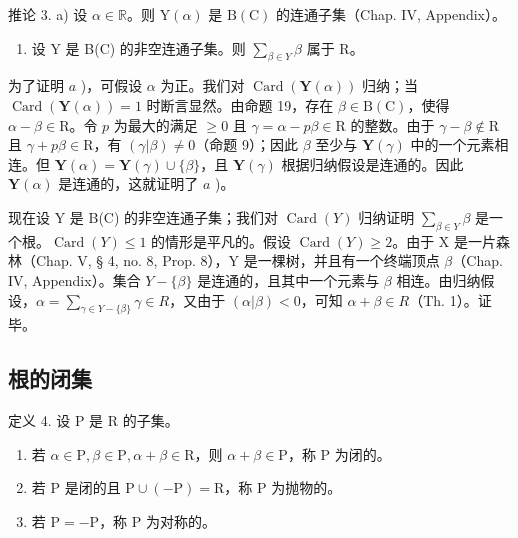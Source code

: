 推论 3. a) 设 \(\alpha \in \mathbb{R}\)。则 \(\mathrm{Y}(\alpha)\) 是 \(\mathrm{B}(\mathrm{C})\) 的连通子集（Chap. IV, Appendix）。

\begin{enumerate}
\def\labelenumi{\alph{enumi})}
\setcounter{enumi}{1}
\tightlist
\item
  设 Y 是 B(C) 的非空连通子集。则 \(\sum_{\beta\in Y}\beta\) 属于 R。
\end{enumerate}

为了证明 \(a\) )，可假设 \(\alpha\) 为正。我们对 \(\operatorname{Card}(\mathbf{Y}(\alpha))\) 归纳；当 \(\operatorname{Card}(\mathbf{Y}(\alpha)) = 1\) 时断言显然。由命题 19，存在 \(\beta \in \mathrm{B}(\mathrm{C})\)，使得 \(\alpha - \beta \in \mathrm{R}\)。令 \(p\) 为最大的满足 \(\geqslant 0\) 且 \(\gamma = \alpha - p\beta \in \mathrm{R}\) 的整数。由于 \(\gamma - \beta \notin \mathrm{R}\) 且 \(\gamma + p\beta \in \mathrm{R}\)，有 \((\gamma|\beta) \neq 0\)（命题 9）；因此 \(\beta\) 至少与 \(\mathbf{Y}(\gamma)\) 中的一个元素相连。但 \(\mathbf{Y}(\alpha) = \mathbf{Y}(\gamma) \cup \{\beta\}\)，且 \(\mathbf{Y}(\gamma)\) 根据归纳假设是连通的。因此 \(\mathbf{Y}(\alpha)\) 是连通的，这就证明了 \(a\) )。

现在设 Y 是 B(C) 的非空连通子集；我们对 \(\operatorname{Card}(Y)\) 归纳证明 \(\sum_{\beta\in Y}\beta\) 是一个根。\(\operatorname{Card}(Y)\leqslant1\) 的情形是平凡的。假设 \(\operatorname{Card}(Y)\geqslant2\)。由于 X 是一片森林（Chap. V, § 4, no. 8, Prop. 8），Y 是一棵树，并且有一个终端顶点 \(\beta\)（Chap. IV, Appendix）。集合 \(Y-\{\beta\}\) 是连通的，且其中一个元素与 \(\beta\) 相连。由归纳假设，\(\alpha=\sum_{\gamma\in Y-\{\beta\}}\gamma\in R\)，又由于 \((\alpha|\beta)<0\)，可知 \(\alpha+\beta\in R\)（Th. 1）。证毕。

\subsection{根的闭集}

定义 4. 设 P 是 R 的子集。

\begin{enumerate}
\def\labelenumi{(\roman{enumi})}
\item
  若 \(\alpha \in \mathrm{P},\beta \in \mathrm{P},\alpha +\beta \in \mathrm{R}\)，则 \(\alpha +\beta \in \mathrm{P}\)，称 P 为闭的。
\item
  若 P 是闭的且 \(\mathrm{P} \cup (-\mathrm{P}) = \mathrm{R}\)，称 P 为抛物的。
\item
  若 \(\mathrm{P} = -\mathrm{P}\)，称 P 为对称的。
\end{enumerate}

